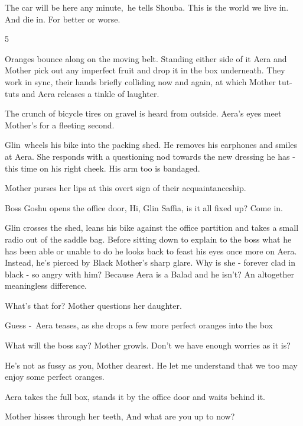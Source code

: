 \documentclass[letterpaper]{article}
\begin{document}
{\textquotedbl}The car will be here any minute,{\textquotedbl}~he tells Shouba. {\textquotedbl}This is the world we live
in. And die in. For better or worse.{\textquotedbl}


\bigskip

5 

Oranges bounce along on the moving belt. Standing either side of it Aera and Mother pick out any imperfect fruit and
drop it in the box underneath. They work in sync, their hands briefly colliding now and again, at which Mother tut-tuts
and Aera releases a tinkle of laughter. 

The crunch of bicycle tires on gravel is heard from outside. Aera's eyes meet Mother's for a fleeting second. 

Glin~wheels his bike into the packing shed. He removes his earphones and smiles at Aera. She responds with a questioning
nod towards the new dressing he has - this time on his right cheek. His arm too is bandaged. 

Mother purses her lips at this overt sign of their acquaintanceship.~~~~~~~ 

Boss Goshu opens the office door, {\textquotedbl}Hi, Glin Saffia, is it all fixed up? Come in.{\textquotedbl}

Glin crosses the shed, leans his bike against the office partition and takes a small radio out of the saddle bag. Before
sitting down to explain to the boss what he has been able or unable to do he looks back to feast his eyes once more on
Aera. Instead, he's pierced by Black Mother's sharp glare. Why is she - forever clad in black - so angry with him?
Because Aera is a Balad and he isn't? An altogether meaningless difference.

{\textquotedbl}What's that for?{\textquotedbl} Mother questions her daughter.

{\textquotedbl}Guess -{\textquotedbl}~Aera teases, as she drops a few more perfect oranges into the box

{\textquotedbl}What will the boss say?{\textquotedbl} Mother growls. {\textquotedbl}Don't we have enough worries as it
is?{\textquotedbl} 

{\textquotedbl}He's not as fussy as you, Mother dearest. He let me understand that we too may enjoy some perfect
oranges.{\textquotedbl} 

Aera takes the full box, stands it by the office door and waits behind it.

Mother hisses through her teeth, {\textquotedbl}And what are you up to now?{\textquotedbl}
\end{document}
